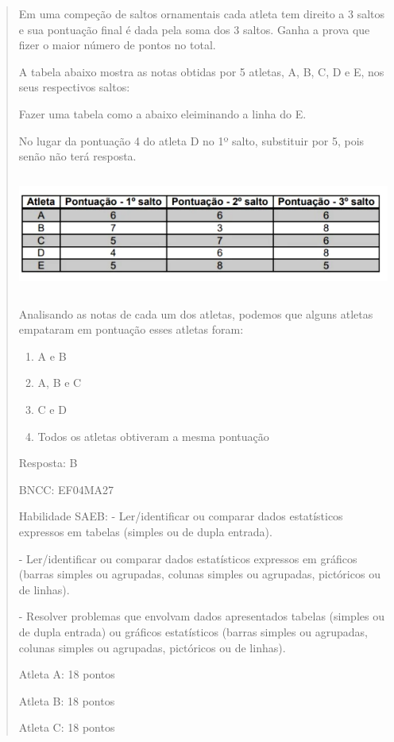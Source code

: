\begin{enumerate}
\begin{escolha}
\begin{enumerate}
\begin{itemize}
\begin{itemize}
\begin{escolha}
\begin{quote}
\begin{escolha}
{Em uma compeção de saltos ornamentais cada atleta tem direito a 3 saltos
e sua pontuação final é dada pela soma dos 3 saltos. Ganha a prova que
fizer o maior número de pontos no total.

A tabela abaixo mostra as notas obtidas por 5 atletas, A, B, C, D e E,
nos seus respectivos saltos:

Fazer uma tabela como a abaixo eleiminando a linha do E.

No lugar da pontuação 4 do atleta D no 1º salto, substituir por 5, pois
senão não terá resposta.

\includegraphics[width=5.90556in,height=1.52431in]{media/image169.png}

Analisando as notas de cada um dos atletas, podemos que alguns atletas
empataram em pontuação esses atletas foram:

\begin{enumerate}
\def\labelenumi{\alph{enumi})}
\item
  A e B
\item
  A, B e C
\item
  C e D
\item
  Todos os atletas obtiveram a mesma pontuação
\end{enumerate}

Resposta: B

BNCC: EF04MA27

Habilidade SAEB: - Ler/identificar ou comparar dados estatísticos
expressos em tabelas (simples ou de dupla entrada).

- Ler/identificar ou comparar dados estatísticos expressos em gráficos
(barras simples ou agrupadas, colunas simples ou agrupadas, pictóricos
ou de linhas).

- Resolver problemas que envolvam dados apresentados tabelas (simples ou
de dupla entrada) ou gráficos estatísticos (barras simples ou agrupadas,
colunas simples ou agrupadas, pictóricos ou de linhas).

Atleta A: 18 pontos

Atleta B: 18 pontos

Atleta C: 18 pontos

}
\end{escolha}
\end{quote}
\end{escolha}
\end{itemize}
\end{itemize}
\end{enumerate}
\end{escolha}
\end{enumerate}

